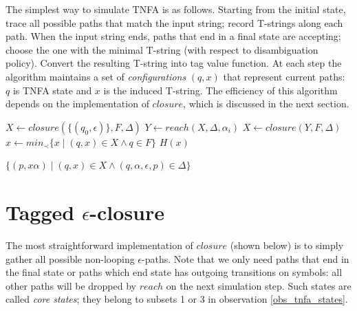 \documentclass{article}
\newcommand{\Xset}{\!\leftarrow\!}
\newcommand{\Xin}{\!\in\!}
\newcommand{\Xeq}{\!=\!}
\theoremstyle{definition}
\begin{document}
\begin{multicols}{2}
The simplest way to simulate TNFA is as follows.
Starting from the initial state, trace all possible paths that match the input string; record T-strings along each path.
When the input string ends, paths that end in a final state are accepting;
choose the one with the minimal T-string (with respect to disambiguation policy).
Convert the resulting T-string into tag value function.
At each step the algorithm maintains a set of \emph{configurations} $(q, x)$ that represent current paths:
$q$ is TNFA state and $x$ is the induced T-string.
The efficiency of this algorithm depends on the implementation of $closure$, which is discussed in the next section.
\\

    \begin{algorithm}[H] \DontPrintSemicolon {} 
     {
        $X \Xset closure(\{ (q_0, \epsilon) \}, F, \Delta)$ \;
        \For {$i \Xeq \overline{1,n}$} {
            $Y \Xset reach(X, \Delta, \alpha_i)$ \;
            $X \Xset closure(Y, F, \Delta)$ \;
        }
        $x \Xset min_\prec\{ x \mid (q, x) \Xin X \wedge q \Xin F \}$ \;
        \Return $H(x)$ \;
    }
    \end{algorithm}

    \begin{algorithm}[H] \DontPrintSemicolon {} 
     {
        \Return $\{ (p, x \alpha) \mid (q, x) \Xin X \wedge (q, \alpha, \epsilon, p) \Xin \Delta \}$
    }
    \end{algorithm}

\section{Tagged $\epsilon$-closure}\label{section_closure}

The most straightforward implementation of $closure$ (shown below)
is to simply gather all possible non-looping $\epsilon$-paths.
Note that we only need paths that end in the final state
or paths which end state has outgoing transitions on symbols:
all other paths will be dropped by $reach$ on the next simulation step.
Such states are called \emph{core states}; they belong to subsets 1 or 3 in observation \ref{obs_tnfa_states}.
\\


\end{multicols}
\end{document}

